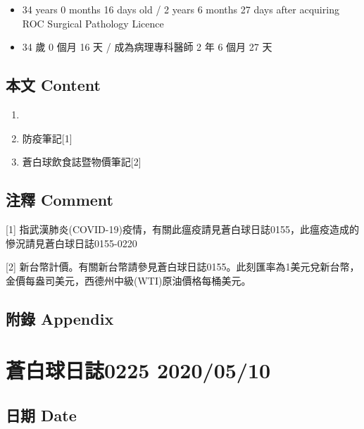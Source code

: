 \documentclass[
]{article}
\providecommand{\tightlist}{%
  \setlength{\itemsep}{0pt}\setlength{\parskip}{0pt}}
\begin{document}
\begin{itemize}
\tightlist
\item
  34 years 0 months 16 days old / 2 years 6 months 27 days after
  acquiring ROC Surgical Pathology Licence
\item
  34 歲 0 個月 16 天 / 成為病理專科醫師 2 年 6 個月 27 天
\end{itemize}

\hypertarget{ux672cux6587-content-8}{%
\subsection{本文 Content}\label{ux672cux6587-content-8}}

\begin{enumerate}
\def\labelenumi{\arabic{enumi}.}
\item
\item
  防疫筆記{[}1{]}
\item
  蒼白球飲食誌暨物價筆記{[}2{]}
\end{enumerate}

\hypertarget{ux6ce8ux91cb-comment-8}{%
\subsection{注釋 Comment}\label{ux6ce8ux91cb-comment-8}}

{[}1{]}
指武漢肺炎(COVID-19)疫情，有關此瘟疫請見蒼白球日誌0155，此瘟疫造成的慘況請見蒼白球日誌0155-0220

{[}2{]}
新台幣計價。有關新台幣請參見蒼白球日誌0155。此刻匯率為1美元兌新台幣，金價每盎司美元，西德州中級(WTI)原油價格每桶美元。

\hypertarget{ux9644ux9304-appendix-8}{%
\subsection{附錄 Appendix}\label{ux9644ux9304-appendix-8}}

\hypertarget{ux84bcux767dux7403ux65e5ux8a8c0225-20200510}{%
\section{蒼白球日誌0225
2020/05/10}\label{ux84bcux767dux7403ux65e5ux8a8c0225-20200510}}

\hypertarget{ux65e5ux671f-date-9}{%
\subsection{日期 Date}\label{ux65e5ux671f-date-9}}
\end{document}
